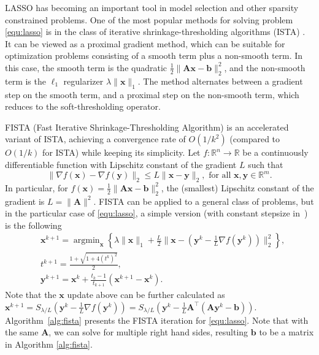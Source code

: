 \documentclass[10pt]{article}  	%
\theoremstyle{definition}
\theoremstyle{definition}
\DeclareMathOperator*{\argmin}{argmin}
\newcommand{\R}{{\mathbb{R}}}
\newcommand{\vb}{\mathbf{b}}
\newcommand{\vx}{\mathbf{x}}
\newcommand{\vy}{\mathbf{y}}
\newcommand{\mA}{\mathbf{A}}
\theoremstyle{remark}
\begin{document}
LASSO has becoming an important tool in model selection and other sparsity constrained problems. One of the most popular methods for solving problem \eqref{equ:lasso} is in the class of iterative shrinkage-thresholding algorithms (ISTA) \cite{FN03, DDD04, FNW08}. It can be viewed as a proximal gradient method, which can be suitable for optimization problems consisting of a smooth term plus a non-smooth term. In this case, the smooth term is the quadratic $\frac{1}{2}\|\mA \vx - \vb\|_2^2$, and the non-smooth term is the $\ell_1$ regularizer $\lambda \|\vx\|_1$. 
The method alternates between a gradient step on the smooth term, and a proximal step on the non-smooth term, which reduces to the soft-thresholding operator.

FISTA (Fast Iterative Shrinkage-Thresholding Algorithm) \cite{BATM2009} is an accelerated variant of ISTA, achieving a convergence rate of $O(1/k^2)$ (compared to $O(1/k)$ for ISTA) while keeping its simplicity. Let $f:\R^n\rightarrow\R$ be a continuously differentiable function with Lipschitz constant of the gradient $L$ such that
$$\|\nabla f(\vx)-\nabla f(\vy)\|_2\leq L\|\vx-\vy\|_2, \text{ for all }\vx, \vy\in\R^m.$$
In particular, for $f(\vx)=\frac{1}{2}\|\mA \vx - \vb\|_2^2$, the (smallest) Lipschitz constant of the gradient is $L=\|\mA\|^2$. FISTA can be applied to a general class of problems, but in the particular case of \eqref{equ:lasso}, a simple version (with constant stepsize in~\cite{BATM2009}) is the following
\begin{align*}
&\vx^{k+1}=\argmin_{\vx}\left\{\lambda\|\vx\|_1+\frac{L}{2}\|\vx-(\vy^k-\frac{1}{L}\nabla f(\vy^k))\|^2_2\right\},\\
&t^{k+1}=\frac{1+\sqrt{1+4(t^k)^2}}{2},\\
&\vy^{k+1}=  \vx^{k} + \frac{t_k - 1}{t_{k+1}}(\vx^{k+1} - \vx^k).
\end{align*}
Note that the $\vx$ update above can be further calculated as $\vx^{k+1}=S_{\lambda/L}(\vy^k-\frac{1}{L}\nabla f(\vy^k))=S_{\lambda/L}(\vy^k-\frac{1}{L}\mA^\top(\mA\vy^k-\vb))$.
Algorithm~\ref{alg:fista} presents the FISTA iteration for \eqref{equ:lasso}. Note that with the same $\mA$, we can solve for multiple right hand sides, resulting $\vb$ to be a matrix in Algorithm \ref{alg:fista}.
\end{document}

